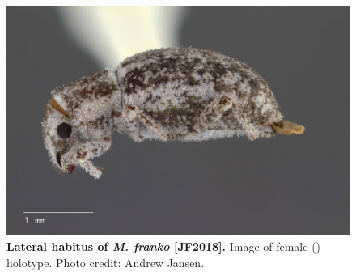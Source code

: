 \documentclass[fleqn,10pt,lineno]{wlpeerj} %
\begin{document}
\begin{figure}[h]
	\begin{sideways}
		\centering
		\includegraphics[height=\textwidth]{figure15.jpg}
	\end{sideways}
	\caption{\textbf{Lateral habitus of \textit{M. franko} [JF2018].} Image of female (\female) holotype. Photo credit: Andrew Jansen.}
	\label{fig:franko_F_lateral}
\end{figure}
\end{document}
